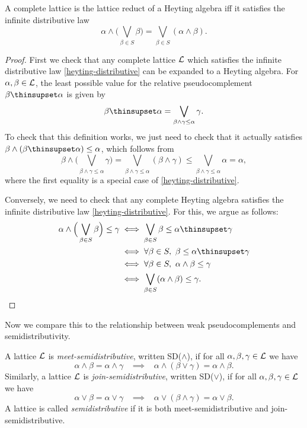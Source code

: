 \begin{appendices}
\begin{prop} A complete lattice is the lattice reduct of a Heyting algebra iff it satisfies the infinite distributive law
\begin{equation}
\alpha \wedge \Big(\bigvee_{\beta \in S} \beta\Big) = \bigvee_{\beta \in S} (\alpha \wedge \beta).\label{heyting-distributive}\tag{D$_\infty$($\wedge$)}
\end{equation}
\end{prop}
\begin{proof} First we check that any complete lattice $\mathcal{L}$ which satisfies the infinite distributive law \eqref{heyting-distributive} can be expanded to a Heyting algebra. For $\alpha, \beta \in \mathcal{L}$, the least possible value for the relative pseudocomplement $\beta \thinsupset \alpha$ is given by
\[
\beta \thinsupset \alpha = \bigvee_{\beta \wedge \gamma \le \alpha} \gamma.
\]
To check that this definition works, we just need to check that it actually satisfies $\beta \wedge (\beta \thinsupset \alpha) \le \alpha$, which follows from
\[
\beta \wedge \Big(\bigvee_{\beta \wedge \gamma \le \alpha} \gamma\Big) = \bigvee_{\beta \wedge \gamma \le \alpha} (\beta \wedge \gamma) \le \bigvee_{\beta \wedge \gamma \le \alpha} \alpha = \alpha,
\]
where the first equality is a special case of \eqref{heyting-distributive}.

Conversely, we need to check that any complete Heyting algebra satisfies the infinite distributive law \eqref{heyting-distributive}. For this, we argue as follows:
\begin{align*}
\alpha \wedge \Big(\bigvee_{\beta \in S} \beta\Big) \le \gamma &\iff \bigvee_{\beta \in S} \beta \le \alpha \thinsupset \gamma\\
&\iff \forall \beta \in S,\ \beta \le \alpha \thinsupset \gamma\\
&\iff \forall \beta \in S,\ \alpha \wedge \beta \le \gamma\\
&\iff \bigvee_{\beta \in S} (\alpha \wedge \beta) \le \gamma.\qedhere
\end{align*}
\end{proof}

Now we compare this to the relationship between weak pseudocomplements and semidistributivity.

\begin{defn} A lattice $\mathcal{L}$ is \emph{meet-semidistributive}, written SD($\wedge$), if for all $\alpha, \beta, \gamma \in \mathcal{L}$ we have
\[
\alpha \wedge \beta = \alpha \wedge \gamma \;\;\; \implies \;\;\; \alpha \wedge (\beta \vee \gamma) = \alpha \wedge \beta.
\]
Similarly, a lattice $\mathcal{L}$ is \emph{join-semidistributive}, written SD($\vee$), if for all $\alpha, \beta, \gamma \in \mathcal{L}$ we have
\[
\alpha \vee \beta = \alpha \vee \gamma \;\;\; \implies \;\;\; \alpha \vee (\beta \wedge \gamma) = \alpha \vee \beta.
\]
A lattice is called \emph{semidistributive} if it is both meet-semidistributive and join-semidistributive.
\end{defn}


\end{appendices}
